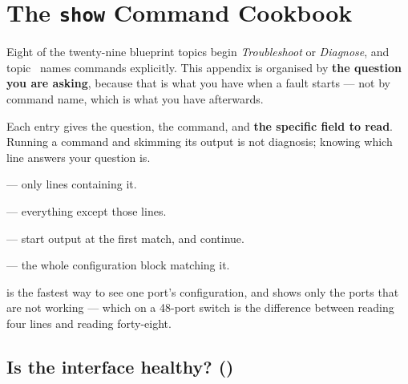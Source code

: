 \chapter{The \textnormal{\texttt{show}} Command Cookbook}\label{app:show}

Eight of the twenty-nine blueprint topics begin \emph{Troubleshoot} or
\emph{Diagnose}, and topic~ names  commands explicitly. This
appendix is organised by \textbf{the question you are asking}, because that is
what you have when a fault starts --- not by command name, which is what you
have afterwards.

Each entry gives the question, the command, and \textbf{the specific field to
read}. Running a command and skimming its output is not diagnosis; knowing which
line answers your question is.

\begin{conceptbox}
\begin{tight}
  \item {} --- only lines containing it.
  \item {} --- everything except those lines.
  \item {} --- start output at the first match, and continue.
  \item {} --- the whole configuration block matching it.
\end{tight}

 is the fastest
way to see one port's configuration, and  shows only the ports that are not working --- which on a 48-port
switch is the difference between reading four lines and reading forty-eight.
\end{conceptbox}

\section{Is the interface healthy? \textnormal{()}}

